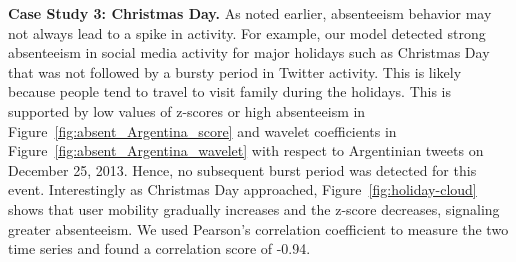 \textbf{Case Study 3: Christmas Day.}
As noted earlier, absenteeism behavior may not always lead to a spike in activity. For example, our model detected strong absenteeism in social media activity for major holidays such as Christmas Day that was not followed by a bursty period in Twitter activity. This is likely because people tend to travel to visit family during the holidays. This is supported by low values of z-scores or high absenteeism in Figure~\ref{fig:absent_Argentina_score} and wavelet coefficients in Figure~\ref{fig:absent_Argentina_wavelet} with respect to Argentinian tweets on December 25, 2013. Hence, no subsequent burst period was detected for this event. Interestingly as Christmas Day approached, Figure~\ref{fig:holiday-cloud} shows that user mobility gradually increases and the z-score decreases, signaling greater absenteeism. We used Pearson's correlation coefficient to measure the two time series and found a correlation score of -0.94.








